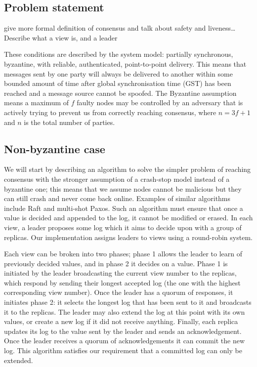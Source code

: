 \subsection{Problem statement}
give more formal definition of consensus and talk about safety and liveness\dots
Describe what a view is, and a leader

These conditions are described by the system model: partially synchronous, byzantine, with reliable, authenticated, point-to-point delivery. This means that messages sent by one party will always be delivered to another within some bounded amount of time after global synchronisation time (GST) has been reached and a message source cannot be spoofed. The Byzantine assumption means a maximum of $f$ faulty nodes may be controlled by an adversary that is actively trying to prevent us from correctly reaching consensus, where $n = 3f + 1$ and $n$ is the total number of parties.

\subsection{Non-byzantine case}
We will start by describing an algorithm to solve the simpler problem of reaching consensus with the stronger assumption of a crash-stop model instead of a byzantine one; this means that we assume nodes cannot be malicious but they can still crash and never come back online. Examples of similar algorithms include Raft and multi-shot Paxos. Such an algorithm must ensure that once a value is decided and appended to the log, it cannot be modified or erased. In each view, a leader proposes some log which it aims to decide upon with a group of replicas. Our implementation assigns leaders to views using a round-robin system.

Each view can be broken into two phases; phase 1 allows the leader to learn of previously decided values, and in phase 2 it decides on a value. Phase 1 is initiated by the leader broadcasting the current view number to the replicas, which respond by sending their longest accepted log (the one with the highest corresponding view number). Once the leader has a quorum of responses, it initiates phase 2: it selects the longest log that has been sent to it and broadcasts it to the replicas. The leader may also extend the log at this point with its own values, or create a new log if it did not receive anything. Finally, each replica updates its log to the value sent by the leader and sends an acknowledgement. Once the leader receives a quorum of acknowledgements it can commit the new log. This algorithm satisfies our requirement that a committed log can only be extended.

